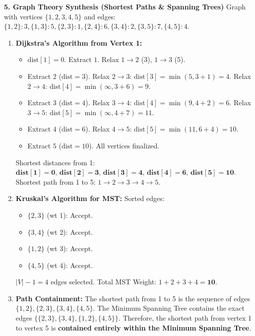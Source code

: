 \textbf{5. Graph Theory Synthesis (Shortest Paths \& Spanning Trees)}
Graph with vertices $\{1, 2, 3, 4, 5\}$ and edges: $\{1, 2\}: 3, \{1, 3\}: 5, \{2, 3\}: 1, \{2, 4\}: 6, \{3, 4\}: 2, \{3, 5\}: 7, \{4, 5\}: 4$.
\begin{enumerate}
    \item \textbf{Dijkstra's Algorithm from Vertex 1:}
    \begin{itemize}
        \item $\text{dist}[1] = 0$. Extract $1$. Relax $1 \to 2$ (3), $1 \to 3$ (5).
        \item Extract $2$ ($\text{dist}=3$). Relax $2 \to 3$: $\text{dist}[3] = \min(5, 3 + 1) = 4$. Relax $2 \to 4$: $\text{dist}[4] = \min(\infty, 3 + 6) = 9$.
        \item Extract $3$ ($\text{dist}=4$). Relax $3 \to 4$: $\text{dist}[4] = \min(9, 4 + 2) = 6$. Relax $3 \to 5$: $\text{dist}[5] = \min(\infty, 4 + 7) = 11$.
        \item Extract $4$ ($\text{dist}=6$). Relax $4 \to 5$: $\text{dist}[5] = \min(11, 6 + 4) = 10$.
        \item Extract $5$ ($\text{dist}=10$). All vertices finalized.
    \end{itemize}
    Shortest distances from 1: $\mathbf{\text{dist}[1]=0, \, \text{dist}[2]=3, \, \text{dist}[3]=4, \, \text{dist}[4]=6, \, \text{dist}[5]=10}$.
    Shortest path from 1 to 5: $1 \to 2 \to 3 \to 4 \to 5$.
    
    \item \textbf{Kruskal's Algorithm for MST:}
    Sorted edges:
    \begin{itemize}
        \item $\{2, 3\}$ (wt 1): Accept.
        \item $\{3, 4\}$ (wt 2): Accept.
        \item $\{1, 2\}$ (wt 3): Accept.
        \item $\{4, 5\}$ (wt 4): Accept.
    \end{itemize}
    $|V| - 1 = 4$ edges selected. Total MST Weight: $1 + 2 + 3 + 4 = \mathbf{10}$.
    
    \item \textbf{Path Containment:}
    The shortest path from 1 to 5 is the sequence of edges $\{1, 2\}, \{2, 3\}, \{3, 4\}, \{4, 5\}$.
    The Minimum Spanning Tree contains the exact edges $\{\{2, 3\}, \{3, 4\}, \{1, 2\}, \{4, 5\}\}$.
    Therefore, the shortest path from vertex 1 to vertex 5 is \textbf{contained entirely within the Minimum Spanning Tree}.
\end{enumerate}

